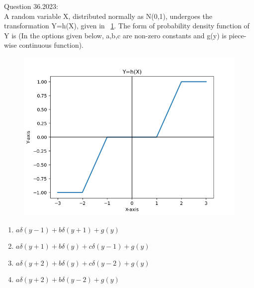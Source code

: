 \documentclass[book,11pt]{IEEEtran}
\newcommand{\figref}[1]{\figurename~\ref{#1}}
\renewcommand\thetable{\arabic{table}}
\begin{document}



\maketitle

\newpage


\bigskip

\renewcommand{\thefigure}{\theenumi}
\renewcommand{\thetable}{\theenumi}

Question 36.2023:\\
A random variable X, distributed normally as N(0,1), undergoes the transformation Y=h(X), given in \figref{fig:36}. The form of probability density function of Y is (In the options given below, a,b,c are non-zero constants and g(y) is piece-wise continuous function).
\begin{figure}[!ht]
\centering
\includegraphics[width=\columnwidth]{figs/Figure.png}
\caption{}
\label{fig:36}
\end{figure}
\begin{enumerate}
\item $a\delta (y-1) + b\delta (y+1) + g(y)$\\
\item $a\delta (y+1) + b\delta (y) + c\delta (y-1) + g(y)$\\
\item $a\delta (y+2) + b\delta (y) + c\delta (y-2) + g(y)$\\
\item $a\delta (y+2) + b\delta (y-2) + g(y)$\\
\end{enumerate}
\end{document}
